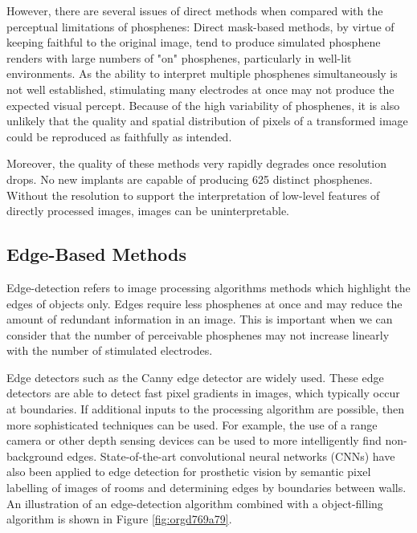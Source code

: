 \documentclass[a4paper,11pt,openany]{book}
\begin{document}
However, there are several issues of direct methods when compared with the perceptual limitations of phosphenes:
Direct mask-based methods, by virtue of keeping faithful to the original image, tend to produce simulated phosphene renders with large numbers of "on" phosphenes, particularly in well-lit environments.
As the ability to interpret multiple phosphenes simultaneously is not well established, stimulating many electrodes at once may not produce the expected visual percept.
Because of the high variability of phosphenes, it is also unlikely that the quality and spatial distribution of pixels of a transformed image could be reproduced as faithfully as intended.

Moreover, the quality of these methods very rapidly degrades once resolution drops. \cite{li_image_2018}
No new implants are capable of producing 625 distinct phosphenes. \cite{lewis_restoration_2015}
Without the resolution to support the interpretation of low-level features of directly processed images, images can be uninterpretable.

\subsection*{Edge-Based Methods}
\label{sec:org58b03e9}

Edge-detection refers to image processing algorithms methods which highlight the edges of objects only. \cite{canny_readings_1987}
Edges require less phosphenes at once and may reduce the amount of redundant information in an image.
This is important when we can consider that the number of perceivable phosphenes may not increase linearly with the number of stimulated electrodes. \cite{bosking_rules_2018}

Edge detectors such as the Canny \cite{canny_readings_1987} edge detector are widely used.
These edge detectors are able to detect fast pixel gradients in images, which typically occur at boundaries.
If additional inputs to the processing algorithm are possible, then more sophisticated techniques can be used.
For example, the use of a range camera or other depth sensing devices can be used to more intelligently find non-background edges. \cite{lui_transformative_2012}
State-of-the-art convolutional neural networks (CNNs) have also been applied to edge detection for prosthetic vision by semantic pixel labelling of images of rooms and determining edges by boundaries between walls. \cite{sanchez-garcia_structural_2018}
An illustration of an edge-detection algorithm combined with a object-filling algorithm is shown in Figure \ref{fig:orgd769a79}.
\end{document}
